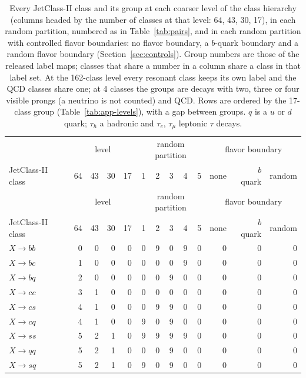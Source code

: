 {\footnotesize
\setlength{\tabcolsep}{3pt}
\begin{longtable}{l rrrrrrrrrrrr}
\caption{Every JetClass-II class and its group at each coarser level of the class hierarchy (columns headed by the number of classes at that level: 64, 43, 30, 17), in each random partition, numbered as in Table~\ref{tab:pairs}, and in each random partition with controlled flavor boundaries: no flavor boundary, a $b$-quark boundary and a random flavor boundary (Section~\ref{sec:controls}). Group numbers are those of the released label maps; classes that share a number in a column share a class in that label set. At the 162-class level every resonant class keeps its own label and the QCD classes share one; at 4 classes the groups are decays with two, three or four visible prongs (a neutrino is not counted) and QCD. Rows are ordered by the 17-class group (Table~\ref{tab:app-levels}), with a gap between groups. $q$ is a $u$ or $d$ quark; $\tau_h$ a hadronic and $\tau_e$, $\tau_\mu$ leptonic $\tau$ decays.}\label{tab:app-vocabulary}\\
\toprule
 & \multicolumn{4}{c}{level} & \multicolumn{5}{c}{random partition} & \multicolumn{3}{c}{flavor boundary} \\
JetClass-II class & 64 & 43 & 30 & 17 & 1 & 2 & 3 & 4 & 5 & none & $b$ quark & random \\
\midrule
\endfirsthead
\toprule
 & \multicolumn{4}{c}{level} & \multicolumn{5}{c}{random partition} & \multicolumn{3}{c}{flavor boundary} \\
JetClass-II class & 64 & 43 & 30 & 17 & 1 & 2 & 3 & 4 & 5 & none & $b$ quark & random \\
\midrule
\endhead
\bottomrule
\endlastfoot
$X\to bb$ & 0 & 0 & 0 & 0 & 0 & 9 & 0 & 9 & 0 & 0 & 0 & 0 \\
$X\to bc$ & 1 & 0 & 0 & 0 & 0 & 0 & 0 & 9 & 0 & 0 & 0 & 0 \\
$X\to bq$ & 2 & 0 & 0 & 0 & 0 & 0 & 9 & 0 & 0 & 0 & 0 & 0 \\
$X\to cc$ & 3 & 1 & 0 & 0 & 0 & 0 & 0 & 0 & 0 & 0 & 0 & 0 \\
$X\to cs$ & 4 & 1 & 0 & 0 & 0 & 9 & 9 & 0 & 0 & 0 & 0 & 0 \\
$X\to cq$ & 4 & 1 & 0 & 0 & 9 & 0 & 9 & 0 & 0 & 0 & 0 & 0 \\
$X\to ss$ & 5 & 2 & 1 & 0 & 9 & 9 & 9 & 9 & 0 & 0 & 0 & 0 \\
$X\to qq$ & 5 & 2 & 1 & 0 & 0 & 0 & 9 & 0 & 0 & 0 & 0 & 0 \\
$X\to sq$ & 5 & 2 & 1 & 0 & 9 & 0 & 9 & 0 & 0 & 0 & 0 & 0 \\

\end{longtable}}
